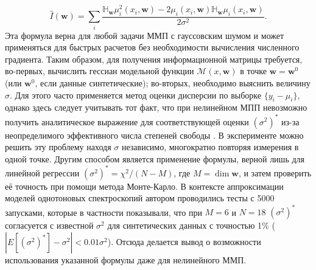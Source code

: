 \documentclass[14pt, a4paper]{extreport}
\numberwithin{equation}{section}
\begin{document}
\begin{equation}
\hat I(\mathbf{w}) = \sum_i \frac{\mathbb{H}_\mathbf{w} \mu_i^2(x_i, \mathbf{w}) - 2 \mu_i(x_i, \mathbf{w}) \mathbb{H}_\mathbf{w} \mu_i(x_i, \mathbf{w})}{2\sigma^2}.
\label{eq:fisher_analytic}
\end{equation}
Эта формула верна для любой задачи ММП с гауссовским шумом и может применяться для быстрых расчетов без необходимости вычисления численного градиента. Таким образом, для получения информационной матрицы требуется, во-первых, вычислить гессиан модельной функции $\mathcal{M}(x, \mathbf{w})$ в точке $\mathbf{w} = \mathbf{w}^0$ (или $ \mathbf{w}^0 $, если данные синтетические); во-вторых, необходимо выяснить величину $\sigma$. Для этого часто применяется метод оценки дисперсии по выборке $\{y_i - \mu_i\}$, однако здесь следует учитывать тот факт, что при нелинейном МПП невозможно получить аналитическое выражение для соответствующей оценки $ (\sigma^2)^* $ из-за неопределимого эффективного числа степеней свободы \cite{ye1998, andrae2010}. В эксперименте можно решить эту проблему находя $\sigma$ независимо, многократно повторяя измерения в одной точке. Другим способом является применение формулы, верной лишь для линейной регрессии $(\sigma^{2})^* = \chi^2/(N-M)$, где $M = \dim \mathbf{w}$, и затем проверить её точность при помощи метода Монте-Карло. В контексте аппроксимации моделей однотоновых спектроскопий автором проводились тесты с 5000 запусками, которые в частности показывали, что при $M=6$ и $N=18$ $ (\sigma^{2})^* $ согласуется с известной $\sigma^2$ для синтетических данных с точностью 1\% ($|E[(\sigma^{2})^*] - \sigma^2|< 0.01 \sigma^2$). Отсюда делается вывод о возможности использования указанной формулы даже для нелинейного ММП.
\end{document}
